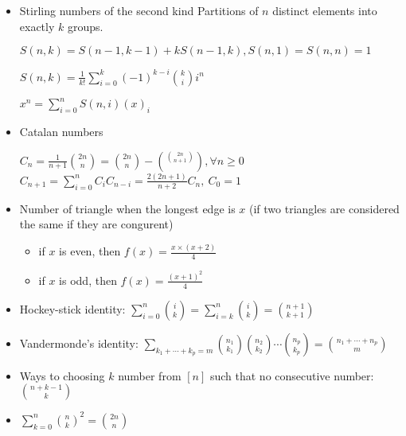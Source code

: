 \begin{itemize}
\item Stirling numbers of the second kind
Partitions of $n$ distinct elements into exactly $k$ groups. 

$S(n, k) = S(n - 1, k - 1) + kS(n - 1, k), S(n, 1) = S(n, n) = 1$

$S(n, k) = \frac{1}{k!}\sum_{i=0}^{k}(-1)^{k-i}{k \choose i}i^n$

$x^n     = \sum_{i=0}^{n} S(n, i) (x)_i$

\item Catalan numbers

$C_n = \frac{1}{n+1}{2n \choose n} = {2n \choose n}-\binom{2n \choose n+1}\ , \forall n \geq 0 $
$C_{n+1} = \sum_{i=0}^{n} C_iC_{n-i} = \frac{2(2n+1)}{n+2}C_n,\ C_0 = 1$


\item Number of triangle when the longest edge is $x$ (if two triangles are considered the same if they are congurent)
\begin{itemize}
    \itemsep-0.5em
	\item if $x$ is even, then $f(x) = \frac{x \times (x + 2)}{4}$
	\item if $x$ is odd, then $f(x) = \frac{(x + 1)^2}{4}$
\end{itemize}

\item Hockey-stick identity: $\displaystyle\sum_{i = 0}^n {i\choose k} = \displaystyle\sum_{i = k}^n {i \choose k} = {{n + 1}\choose{k + 1}}$

\item Vandermonde's identity: $\displaystyle\sum_{k_1 + \cdots + k_p = m} {{n_1}\choose{k_1}}{{n_2}\choose{k_2}} \cdots {{n_p}\choose{k_p}} = {{n_1 + \cdots + n_p}\choose m}$

\item Ways to choosing $k$ number from $[n]$ such that no consecutive number: ${{n + k - 1}\choose k}$

\item $\displaystyle\sum_{k = 0}^n {n\choose k}^2 = {{2n}\choose n}$

\end{itemize}
